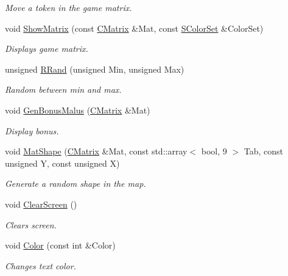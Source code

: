 \begin{DoxyCompactItemize}
\begin{DoxyCompactList}\small\item\em Move a token in the game matrix. \end{DoxyCompactList}\item 
void \hyperlink{namespace_chase_game_a871395f1f12e55eaa3d341b8ef2cbb78}{Show\-Matrix} (const \hyperlink{namespace_chase_game_a469449f9237e59efce3982127366c550}{C\-Matrix} \&Mat, const \hyperlink{struct_chase_game_1_1_s_color_set}{S\-Color\-Set} \&Color\-Set)
\begin{DoxyCompactList}\small\item\em Displays game matrix. \end{DoxyCompactList}\item 
unsigned \hyperlink{namespace_chase_game_aee2df7cbf4974e167612a7415943f3b0}{R\-Rand} (unsigned Min, unsigned Max)
\begin{DoxyCompactList}\small\item\em Random between min and max. \end{DoxyCompactList}\item 
void \hyperlink{namespace_chase_game_a6351b2bdc824272990926fbb8e8ad359}{Gen\-Bonus\-Malus} (\hyperlink{namespace_chase_game_a469449f9237e59efce3982127366c550}{C\-Matrix} \&Mat)
\begin{DoxyCompactList}\small\item\em Display bonus. \end{DoxyCompactList}\item 
void \hyperlink{namespace_chase_game_a049d8d8beb22431889ca7ba34cc90871}{Mat\-Shape} (\hyperlink{namespace_chase_game_a469449f9237e59efce3982127366c550}{C\-Matrix} \&Mat, const std\-::array$<$ bool, 9 $>$ Tab, const unsigned Y, const unsigned X)
\begin{DoxyCompactList}\small\item\em Generate a random shape in the map. \end{DoxyCompactList}\item 
void \hyperlink{namespace_chase_game_a3a7382465f6f23fe77cde4e589fb80d6}{Clear\-Screen} ()
\begin{DoxyCompactList}\small\item\em Clears screen. \end{DoxyCompactList}\item 
void \hyperlink{namespace_chase_game_a3a120300b1e200a26fe8680a33300283}{Color} (const int \&Color)
\begin{DoxyCompactList}\small\item\em Changes text color. \end{DoxyCompactList}\item 

\end{DoxyCompactItemize}
